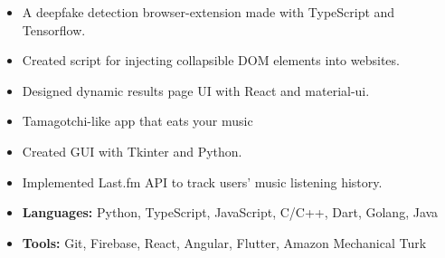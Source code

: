 
\begin{itemize}
\item A deepfake detection browser-extension made with TypeScript and Tensorflow.
\item Created script for injecting collapsible DOM elements into websites.
\item Designed dynamic results page UI with React and material-ui.
\end{itemize}
\smallskip

\divider

\begin{itemize}
\item Tamagotchi-like app that eats your music
\item Created GUI with Tkinter and Python.
\item Implemented Last.fm API to track users’ music listening history.
\end{itemize}



\begin{itemize}
    \item \textbf{Languages:} Python, TypeScript, JavaScript, C/C++, Dart, Golang, Java
    \item \textbf{Tools:} Git, Firebase, React, Angular, Flutter, Amazon Mechanical Turk
\end{itemize}